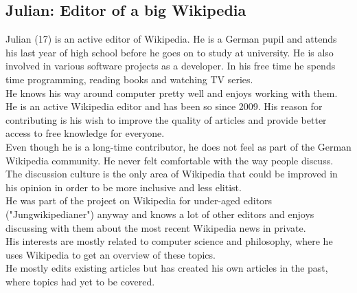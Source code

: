 \subsection{Julian: Editor of a big Wikipedia}
Julian (17) is an active editor of Wikipedia. He is a German pupil and attends his last year of high school before he goes on to study at university. He is also involved in various software projects as a developer. In his free time he spends time programming, reading books and watching TV series. \\
He knows his way around computer pretty well and enjoys working with them. \\
He is an active Wikipedia editor and has been so since 2009. His reason for contributing is his wish to improve the quality of articles and provide better access to free knowledge for everyone. \\
Even though he is a long-time contributor, he does not feel as part of the German Wikipedia community. He never felt comfortable with the way people discuss. The discussion culture is the only area of Wikipedia that could be improved in his opinion in order to be more inclusive and less elitist. \\
He was part of the project on Wikipedia for under-aged editors ("Jungwikipedianer") anyway and knows a lot of other editors and enjoys discussing with them about the most recent Wikipedia news in private. \\
His interests are mostly related to computer science and philosophy, where he uses Wikipedia to get an overview of these topics. \\
He mostly edits existing articles but has created his own articles in the past, where topics had yet to be covered.

